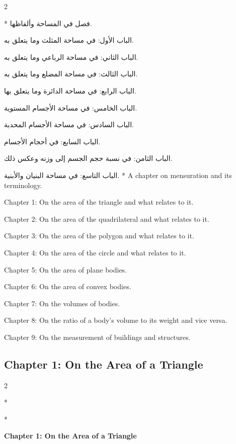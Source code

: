 \documentclass[11pt,a4paper]{article}
\newcommand{\ar}[1]{{\arabicfont\beginR #1\endR}}
\newenvironment{bilingual}{%
  \vspace{0.3em}%
  \begin{paracol}{2}%
}{%
  \end{paracol}%
  \vspace{0.3em}%
}
\begin{document}
\begin{bilingual}
\switchcolumn[0]*
\ar{فصل في المساحة وألفاظها.}

\ar{الباب الأول: في مساحة المثلث وما يتعلق به.}

\ar{الباب الثاني: في مساحة الرباعي وما يتعلق به.}

\ar{الباب الثالث: في مساحة المضلع وما يتعلق به.}

\ar{الباب الرابع: في مساحة الدائرة وما يتعلق بها.}

\ar{الباب الخامس: في مساحة الأجسام المستوية.}

\ar{الباب السادس: في مساحة الأجسام المحدبة.}

\ar{الباب السابع: في أحجام الأجسام.}

\ar{الباب الثامن: في نسبة حجم الجسم إلى وزنه وعكس ذلك.}

\ar{الباب التاسع: في مساحة البنيان والأبنية.}
\switchcolumn[1]*
A chapter on mensuration and its terminology.

Chapter 1: On the area of the triangle and what relates to it.

Chapter 2: On the area of the quadrilateral and what relates to it.

Chapter 3: On the area of the polygon and what relates to it.

Chapter 4: On the area of the circle and what relates to it.

Chapter 5: On the area of plane bodies.

Chapter 6: On the area of convex bodies.

Chapter 7: On the volumes of bodies.

Chapter 8: On the ratio of a body's volume to its weight and vice versa.

Chapter 9: On the measurement of buildings and structures.
\end{bilingual}

\subsection{Chapter 1: On the Area of a Triangle}

\begin{bilingual}
\switchcolumn[0]*
\begin{center}
\textbf{\color{chapcolor}\ar{فصل في مساحة المثلث}}
\end{center}
\switchcolumn[1]*
\begin{center}
\textbf{\color{chapcolor}Chapter 1: On the Area of a Triangle}
\end{center}
\end{bilingual}
\end{document}
